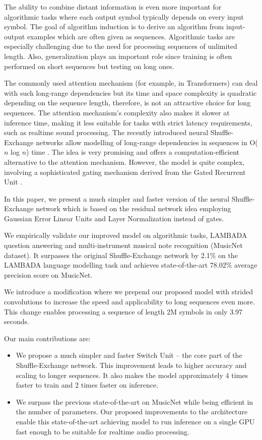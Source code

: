 \documentclass[letterpaper]{article} %
\begin{document}
The ability to combine distant information is even more important for algorithmic tasks where each output symbol typically depends on every input symbol. The goal of algorithm induction is to derive an algorithm from input-output examples which are often given as sequences. Algorithmic tasks are especially challenging due to the need for processing sequences of unlimited length. Also, generalization plays an important role since training is often performed on short sequences but testing on long ones.

The commonly used attention mechanism (for example, in Transformers) can deal with such long-range dependencies but its time and space complexity is quadratic depending on the sequence length, therefore, is not an attractive choice for long sequences. The attention mechanism's complexity also makes it slower at inference time, making it less suitable for tasks with strict latency requirements, such as realtime sound processing. The recently introduced neural Shuffle-Exchange networks allow modelling of long-range dependencies in sequences in O($n$ log $n$) time \cite{shuffle-exchange}. The idea is very promising and offers a computation-efficient alternative to the attention mechanism. However, the model is quite complex, involving a sophisticated gating mechanism derived from the Gated Recurrent Unit \citep{cho2014learning}.

In this paper, we present a much simpler and faster version of the neural Shuffle-Exchange network which is based on the residual network idea employing Gaussian Error Linear Units \citep{hendrycks2016gaussian} and Layer Normalization \citep{ba2016layer} instead of gates.

We empirically validate our improved model on algorithmic tasks, LAMBADA question answering and multi-instrument musical note recognition (MusicNet dataset). It surpasses the original Shuffle-Exchange network by 2.1\% on the LAMBADA language modelling task and achieves state-of-the-art 78.02\% average precision score on MusicNet.

We introduce a modification where we prepend our proposed model with strided convolutions to increase the speed and applicability to long sequences even more. This change enables processing a sequence of length 2M symbols in only 3.97 seconds.

Our main contributions are:
\begin{itemize}
  \item We propose a much simpler and faster Switch Unit -- the core part of the Shuffle-Exchange network. This improvement leads to higher accuracy and scaling to longer sequences. It also makes the model approximately 4 times faster to train and 2 times faster on inference.
  \item We surpass the previous state-of-the-art on MusicNet while being efficient in the number of parameters. Our proposed improvements to the architecture enable this state-of-the-art achieving model to run inference on a single GPU fast enough to be suitable for realtime audio processing.
\end{itemize}
\end{document}
